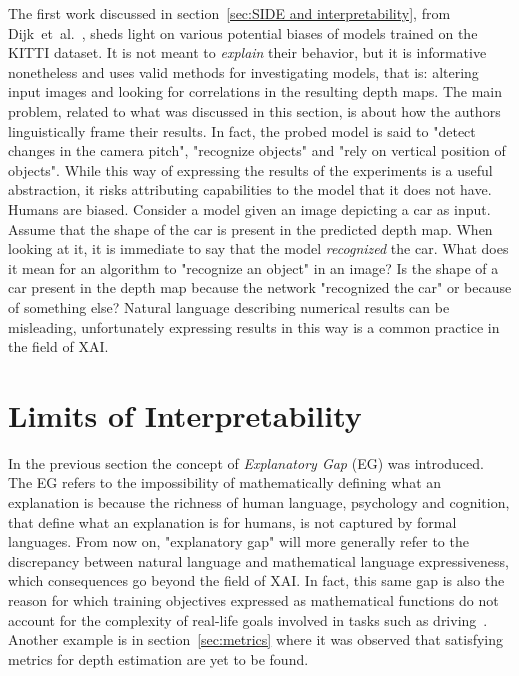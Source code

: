 The first work discussed in section~\ref{sec:SIDE and interpretability}, from Dijk~et~al.~\cite{Dijk}, sheds light on various potential biases of models trained on the KITTI dataset.
It is not meant to \textit{explain} their behavior, but it is informative nonetheless and uses valid methods for investigating models, that is: altering input images and looking for correlations in the resulting depth maps.
The main problem, related to what was discussed in this section, is about how the authors linguistically frame their results.
In fact, the probed model is said to "detect changes in the camera pitch", "recognize objects" and "rely on vertical position of objects".
While this way of expressing the results of the experiments is a useful abstraction, it risks attributing capabilities to the model that it does not have.
Humans are biased.
Consider a model given an image depicting a car as input.
Assume that the shape of the car is present in the predicted depth map.
When looking at it, it is immediate to say that the model \textit{recognized} the car.
What does it mean for an algorithm to "recognize an object" in an image?
Is the shape of a car present in the depth map because the network "recognized the car" or because of something else?
Natural language describing numerical results can be misleading, unfortunately expressing results in this way is a common practice in the field of XAI.

\vspace{0.5cm}

\section{Limits of Interpretability}
\label{sec:limits of interpretability}

In the previous section the concept of \textit{Explanatory Gap} (EG) was introduced.
The EG refers to the impossibility of mathematically defining what an explanation is because the richness of human language, psychology and cognition, that define what an explanation is for humans, is not captured by formal languages.
From now on, "explanatory gap" will more generally refer to the discrepancy between natural language and mathematical language expressiveness, which consequences go beyond the field of XAI.
In fact, this same gap is also the reason for which training objectives expressed as mathematical functions do not account for the complexity of real-life goals involved in tasks such as driving~\cite{Zablocki2022}.
Another example is in section~\ref{sec:metrics} where it was observed that satisfying metrics for depth estimation are yet to be found.

